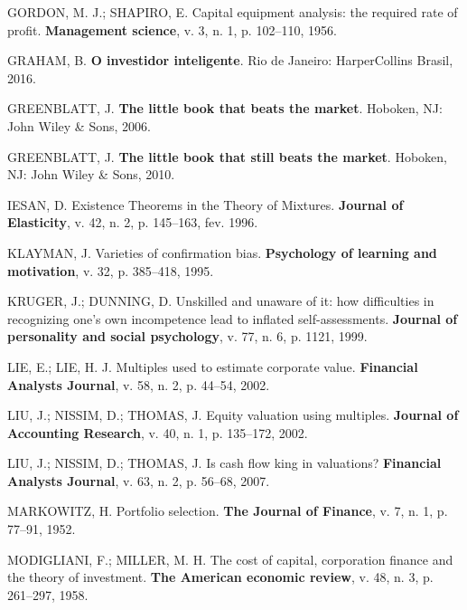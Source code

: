 \documentclass[grad,numbers]{coppe}
\newenvironment{cslreferences}%
  {}%
  {\par}
\begin{document}
\begin{cslreferences}
  \leavevmode\hypertarget{ref-gordon1956}{}%
  GORDON, M. J.; SHAPIRO, E. Capital equipment analysis: the required rate of profit. \textbf{Management science}, v. 3, n. 1, p. 102--110, 1956.

  \leavevmode\hypertarget{ref-graham2016}{}%
  GRAHAM, B. \textbf{O investidor inteligente}. Rio de Janeiro: HarperCollins Brasil, 2016.

  \leavevmode\hypertarget{ref-greenblatt2006}{}%
  GREENBLATT, J. \textbf{The little book that beats the market}. Hoboken, NJ: John Wiley \& Sons, 2006.

  \leavevmode\hypertarget{ref-greenblatt2010}{}%
  GREENBLATT, J. \textbf{The little book that still beats the market}. Hoboken, NJ: John Wiley \& Sons, 2010.

  \leavevmode\hypertarget{ref-article-example}{}%
  IESAN, D. Existence Theorems in the Theory of Mixtures. \textbf{Journal of Elasticity}, v. 42, n. 2, p. 145--163, fev. 1996.

  \leavevmode\hypertarget{ref-klayman1995}{}%
  KLAYMAN, J. Varieties of confirmation bias. \textbf{Psychology of learning and motivation}, v. 32, p. 385--418, 1995.

  \leavevmode\hypertarget{ref-kruger1999}{}%
  KRUGER, J.; DUNNING, D. Unskilled and unaware of it: how difficulties in recognizing one's own incompetence lead to inflated self-assessments. \textbf{Journal of personality and social psychology}, v. 77, n. 6, p. 1121, 1999.

  \leavevmode\hypertarget{ref-lie2002}{}%
  LIE, E.; LIE, H. J. Multiples used to estimate corporate value. \textbf{Financial Analysts Journal}, v. 58, n. 2, p. 44--54, 2002.

  \leavevmode\hypertarget{ref-liu2002}{}%
  LIU, J.; NISSIM, D.; THOMAS, J. Equity valuation using multiples. \textbf{Journal of Accounting Research}, v. 40, n. 1, p. 135--172, 2002.

  \leavevmode\hypertarget{ref-liu2007}{}%
  LIU, J.; NISSIM, D.; THOMAS, J. Is cash flow king in valuations? \textbf{Financial Analysts Journal}, v. 63, n. 2, p. 56--68, 2007.

  \leavevmode\hypertarget{ref-markowitz1952}{}%
  MARKOWITZ, H. Portfolio selection. \textbf{The Journal of Finance}, v. 7, n. 1, p. 77--91, 1952.

  \leavevmode\hypertarget{ref-modigliani1958}{}%
  MODIGLIANI, F.; MILLER, M. H. The cost of capital, corporation finance and the theory of investment. \textbf{The American economic review}, v. 48, n. 3, p. 261--297, 1958.


\end{cslreferences}
\end{document}
